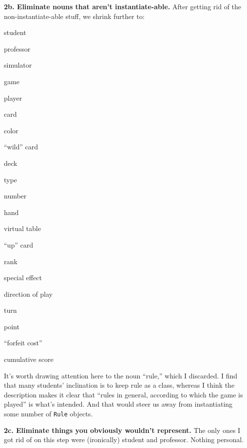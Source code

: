 \vspace{.1in}
\textbf{2b. Eliminate nouns that aren't instantiate-able.} After getting rid
of the non-instantiate-able stuff, we shrink further to:

\begin{samepage}
\begin{multicols}{3}
\small
\begin{compactitem}
\renewcommand\labelitemi{\raisebox{0.25ex}{\tiny$\bullet$}}
\item \textsf{student}
\item \textsf{professor}
\item \textsf{simulator}
\item \textsf{game}
\item \textsf{player}
\item \textsf{card}
\item \textsf{color}
\columnbreak
\item \textsf{``wild'' card}
\item \textsf{deck}
\item \textsf{type}
\item \textsf{number}
\item \textsf{hand}
\item \textsf{virtual table}
\item \textsf{``up'' card}
\columnbreak
\item \textsf{rank}
\item \textsf{special effect}
\item \textsf{direction of play}
\item \textsf{turn}
\item \textsf{point}
\item \textsf{``forfeit cost''}
\item \textsf{cumulative score}
\end{compactitem}
\end{multicols}
\end{samepage}

It's worth drawing attention here to the noun ``\textsf{rule},'' which I
discarded. I find that many students' inclination is to keep \textsf{rule} as
a class, whereas I think the description makes it clear that ``rules in
general, according to which the game is played'' is what's intended. And that
would steer us away from instantiating some number of \texttt{Rule} objects.

\vspace{.1in}
\pagebreak
\textbf{2c. Eliminate things you obviously wouldn't represent.} The only ones
I got rid of on this step were (ironically) \textsf{student} and
\textsf{professor}. Nothing personal.

